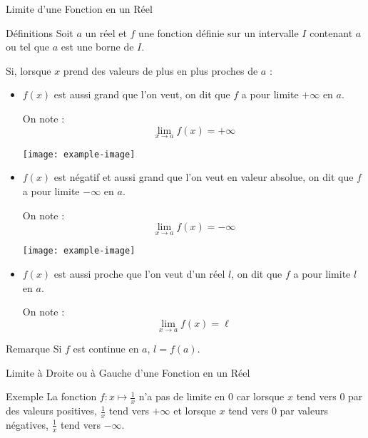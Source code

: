 \documentclass{cours}
\begin{document}
    \begin{Gpartie}{Limite d'une Fonction en un Réel} 
        \begin{Spartie}{Définitions} 
            Soit $a$ un réel et $f$ une fonction définie sur un intervalle $I$ contenant $a$ ou tel que $a$ est une borne de $I$.

            Si, lorsque $x$ prend des valeurs de plus en plus proches de $a$ :
            \begin{itemize}
                \item $f(x)$ est aussi grand que l'on veut, on dit que $f$ a pour limite $+\infty$ en $a$.

                On note : \[\lim\limits_{x\to a}f(x)=+\infty\]
                \begin{center}
                        \texttt{[image: example-image]}
                    \parbox{\linewidth}{}
                \end{center}
                \vspace*{2ex}
                \item $f(x)$ est négatif et aussi grand que l'on veut en valeur absolue, on dit que $f$ a pour limite $-\infty$ en $a$.

                On note : \[\lim\limits_{x\to a}f(x)=-\infty\]
                \begin{center}
                        \texttt{[image: example-image]}
                    \parbox{\linewidth}{}
                \end{center}
                \vspace*{2ex}
                \item $f(x)$ est aussi proche que l'on veut d'un réel $l$, on dit que $f$ a pour limite $l$ en $a$.
                
                On note : \[\lim\limits_{x\to a}f(x)=\ell\]
            \end{itemize}
            \begin{SSpartie}{Remarque} 
                Si $f$ est continue en $a$, $l=f(a)$.
            \end{SSpartie}
        \end{Spartie}
        \begin{Spartie}{Limite à Droite ou à Gauche d'une Fonction en un Réel} 
            \begin{SSpartie}{Exemple} 
                La fonction $f:x\mapsto\frac{1}{x}$ n'a pas de limite en $0$ car lorsque $x$ tend vers $0$ par des valeurs positives, $\frac{1}{x}$ tend vers $+\infty$ et lorsque $x$ tend vers $0$ par valeurs négatives, $\frac{1}{x}$ tend vers $-\infty$.


\end{SSpartie}
\end{Spartie}
\end{Gpartie}
\end{document}
